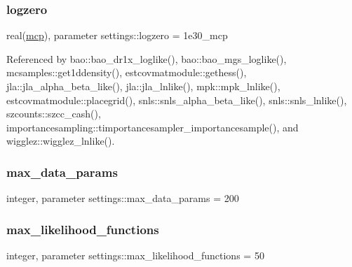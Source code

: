 \mbox{\label{namespacesettings_a057b984bb501467c33dbcc3ffc3a34d3}} 
\subsubsection{\texorpdfstring{logzero}{logzero}}
{\footnotesize\ttfamily real(\mbox{\hyperlink{namespacesettings_a341fa0fe410054f78630c33e118669bf}{mcp}}), parameter settings\+::logzero = 1e30\+\_\+mcp}



Referenced by bao\+::bao\+\_\+dr1x\+\_\+loglike(), bao\+::bao\+\_\+mgs\+\_\+loglike(), mcsamples\+::get1ddensity(), estcovmatmodule\+::gethess(), jla\+::jla\+\_\+alpha\+\_\+beta\+\_\+like(), jla\+::jla\+\_\+lnlike(), mpk\+::mpk\+\_\+lnlike(), estcovmatmodule\+::placegrid(), snls\+::snls\+\_\+alpha\+\_\+beta\+\_\+like(), snls\+::snls\+\_\+lnlike(), szcounts\+::szcc\+\_\+cash(), importancesampling\+::timportancesampler\+\_\+importancesample(), and wigglez\+::wigglez\+\_\+lnlike().

\mbox{\label{namespacesettings_a4d2d308b7b3d47f91cd40d6c735b4d99}} 
\subsubsection{\texorpdfstring{max\+\_\+data\+\_\+params}{max\_data\_params}}
{\footnotesize\ttfamily integer, parameter settings\+::max\+\_\+data\+\_\+params = 200}

\mbox{\label{namespacesettings_a23df6252cfd71721b764c455de43905a}} 
\subsubsection{\texorpdfstring{max\+\_\+likelihood\+\_\+functions}{max\_likelihood\_functions}}
{\footnotesize\ttfamily integer, parameter settings\+::max\+\_\+likelihood\+\_\+functions = 50}

\mbox{\label{namespacesettings_ab891b6a835eb8706eb0477db68a2c351}} 
